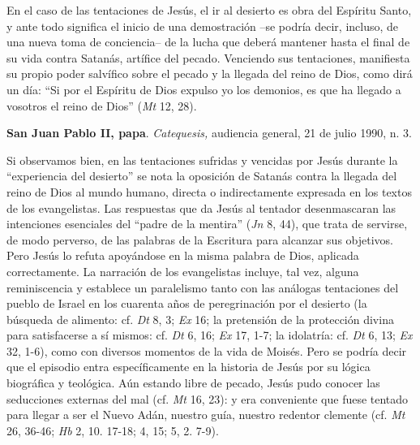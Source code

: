 			\begin{patercite}En el caso de las tentaciones de Jesús, el ir al desierto es obra del Espíritu Santo, y ante todo significa el inicio de una demostración –se podría decir, incluso, de una nueva toma de conciencia– de la lucha que deberá mantener hasta el final de su vida contra Satanás, artífice del pecado. Venciendo sus tentaciones, manifiesta su propio poder salvífico sobre el pecado y la llegada del reino de Dios, como dirá un día: “Si por el Espíritu de Dios expulso yo los demonios, es que ha llegado a vosotros el reino de Dios” (\textit{Mt} 12, 28).\end{patercite}
			
			\begin{patercite}\textbf{San Juan Pablo II, papa}. \textit{Catequesis,} audiencia general, 21 de julio 1990, n. 3.\end{patercite}
			
			\begin{patercite}[+] Si observamos bien, en las tentaciones sufridas y vencidas por Jesús durante la “experiencia del desierto” se nota la oposición de Satanás contra la llegada del reino de Dios al mundo humano, directa o indirectamente expresada en los textos de los evangelistas. Las respuestas que da Jesús al tentador desenmascaran las intenciones esenciales del “padre de la mentira” (\textit{Jn} 8, 44), que trata de servirse, de modo perverso, de las palabras de la Escritura para alcanzar sus objetivos. Pero Jesús lo refuta apoyándose en la misma palabra de Dios, aplicada correctamente. La narración de los evangelistas incluye, tal vez, alguna reminiscencia y establece un paralelismo tanto con las análogas tentaciones del pueblo de Israel en los cuarenta años de peregrinación por el desierto (la búsqueda de alimento: cf. \textit{Dt} 8, 3; \textit{Ex} 16; la pretensión de la protección divina para satisfacerse a sí mismos: cf. \textit{Dt} 6, 16; \textit{Ex} 17, 1-7; la idolatría: cf. \textit{Dt} 6, 13; \textit{Ex }32, 1-6), como con diversos momentos de la vida de Moisés. Pero se podría decir que el episodio entra específicamente en la historia de Jesús por su lógica biográfica y teológica. Aún estando libre de pecado, Jesús pudo conocer las seducciones externas del mal (cf. \textit{Mt} 16, 23): y era conveniente que fuese tentado para llegar a ser el Nuevo Adán, nuestro guía, nuestro redentor clemente (cf. \textit{Mt} 26, 36-46; \textit{Hb} 2, 10. 17-18; 4, 15; 5, 2. 7-9).\end{patercite}
			
